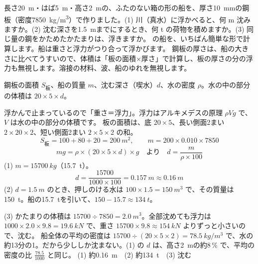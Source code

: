 \begin{phreidai}
\label{ph:力-12:ex9}長さ\qty{20}{m}・はば\qty{5}{m}・高さ\qty{2}{m}の、ふたのない箱の形の船を、厚さ\qty{10}{mm}の鋼板（密度\qty{7850}{kg/m^3}）で作りました。(1) 川（真水）に浮かべると、何 m 沈みますか。(2) 沈む深さを\qty{1.5}{m}までにするとき、何 t の荷物を積めますか。(3) 同じ量の鋼をかためたかたまりは、浮きますか。
\phbamen
\bkhatenaref の船を、いちばん簡単な形で計算します。船は重さと浮力がつり合って浮かびます。
\phmushi
鋼板の厚さは、船の大きさに比べてうすいので、体積は「板の面積×厚さ」で計算し、板の厚さの分の浮力も無視します。溶接の材料、波、船のゆれを無視します。
\phzu
\noindent\begin{minipage}[c]{0.46\linewidth}\centering
{}
\end{minipage}\hfill
\begin{minipage}[c]{0.51\linewidth}\raggedright
鋼板の面積 $S_{\text{板}}$、船の質量 $m$、沈む深さ（喫水）$d$、水の密度 $\rho$。水の中の部分の体積は $20\times5\times d$。
\end{minipage}
\phriyu
浮かんで止まっているので「重さ＝浮力」。浮力はアルキメデスの原理 $\rho Vg$ で、$V$ は水の中の部分の体積です。
\phtateru
板の面積は、底 $20\times5$、長い側面2まい $2\times20\times2$、短い側面2まい $2\times5\times2$ の和。
\[ S_{\text{板}}=100+80+20=\qty{200}{m^2},\qquad m=200\times0.010\times7850 \]
\[ mg=\rho\times(20\times5\times d)\times g \quad\text{より}\quad d=\frac{m}{\rho\times100} \]
\phtoku
(1) $m=\qty{15700}{kg}$（\qty{15.7}{t}）。
\[ d=\frac{\num{15700}}{1000\times100}=\qty{0.157}{m}\approx\qty{0.16}{m} \]
(2) $d=\qty{1.5}{m}$ のとき、押しのける水は $100\times1.5=\qty{150}{m^3}$ で、その質量は\qty{150}{t}。船の\qty{15.7}{t}を引いて、$150-15.7\approx\qty{134}{t}$。\par
(3) かたまりの体積は $\num{15700}\div 7850=\qty{2.0}{m^3}$。全部沈めても浮力は $1000\times2.0\times9.8=\qty{19.6}{kN}$ で、重さ $\num{15700}\times9.8\approx\qty{154}{kN}$ よりずっと小さいので、沈む。
\phtashikame
船全体の平均の密度は $\num{15700}\div (20\times5\times2)=\qty{78.5}{kg/m^3}$ で、水の約13分の1。だから少ししか沈まない。(1) の $d$ は、高さ\qty{2}{m}の約8\,\% で、平均の密度の比 $\tfrac{78.5}{1000}$ と同じ。
\kotae (1) 約\qty{0.16}{m}　(2) 約\qty{134}{t}　(3) 沈む
\end{phreidai}
